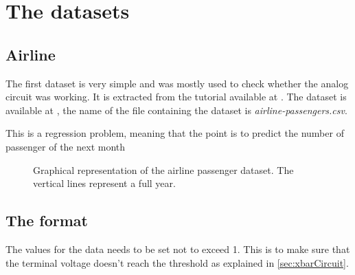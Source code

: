\section{The datasets}\label{sec:dataset}

\subsection{Airline}

The first dataset is very simple and was mostly used to check whether the analog circuit was working. It is extracted from the tutorial available at \cite{airline}. The dataset is available at \cite{datasets}, the name of the file containing the dataset is \textit{airline-passengers.csv}.

This is a regression problem, meaning that the point is to predict the number of passenger of the next month

\begin{figure}[H]
\centering

\caption{Graphical representation of the airline passenger dataset. The vertical lines represent a full year.}
\label{fig:afGraph}
\end{figure}

\subsection{The format}

The values for the data needs to be set not to exceed 1. This is to make sure that the terminal voltage doesn't reach the threshold as explained in \cref{sec:xbarCircuit}.
